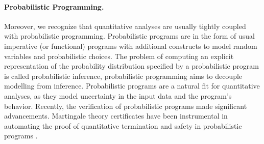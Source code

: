 \paragraph{Probabilistic Programming.}
Moreover, we recognize that quantitative analyses are usually tightly coupled with probabilistic programming.
Probabilistic programs  are in the form of usual imperative (or functional) programs with additional constructs to model random variables and probabilistic choices.
The problem of computing an explicit representation of the probability distribution specified by a probabilistic program is called probabilistic inference, probabilistic programming aims to decouple modelling from inference.
Probabilistic programs are a natural fit for quantitative analyses, as they model uncertainty in the input data and the program's behavior.
%
Recently, the verification of probabilistic programs made significant advancements.
Martingale theory certificates have been instrumental in automating the proof of quantitative termination and safety in probabilistic programs .
